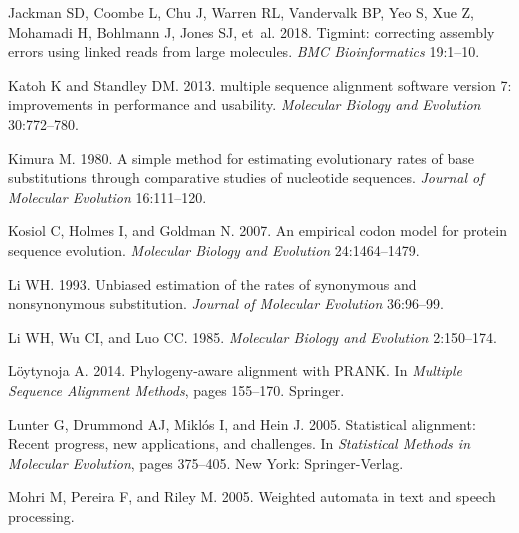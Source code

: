 \documentclass[12pt,letterpaper]{article}
\begin{document}
\begin{thebibliography}{43}
Jackman SD, Coombe L, Chu J, Warren RL, Vandervalk BP, Yeo S, Xue Z, Mohamadi
  H, Bohlmann J, Jones SJ, et~al. 2018.
\newblock Tigmint: correcting assembly errors using linked reads from large
  molecules.
\newblock \emph{BMC Bioinformatics} 19:1--10.

Katoh K and Standley DM. 2013.
 multiple sequence alignment software version 7: improvements
  in performance and usability.
\newblock \emph{Molecular Biology and Evolution} 30:772--780.

Kimura M. 1980.
\newblock A simple method for estimating evolutionary rates of base
  substitutions through comparative studies of nucleotide sequences.
\newblock \emph{Journal of Molecular Evolution} 16:111--120.

Kosiol C, Holmes I, and Goldman N. 2007.
\newblock An empirical codon model for protein sequence evolution.
\newblock \emph{Molecular Biology and Evolution} 24:1464--1479.

Li WH. 1993.
\newblock Unbiased estimation of the rates of synonymous and nonsynonymous
  substitution.
\newblock \emph{Journal of Molecular Evolution} 36:96--99.

Li WH, Wu CI, and Luo CC. 1985.
\newblock \emph{Molecular Biology and Evolution} 2:150--174.

L{\"o}ytynoja A. 2014.
\newblock Phylogeny-aware alignment with {PRANK}.
\newblock In \emph{Multiple Sequence Alignment Methods}, pages 155--170.
  Springer.

Lunter G, Drummond AJ, Mikl{\'o}s I, and Hein J. 2005.
\newblock Statistical alignment: Recent progress, new applications, and
  challenges.
\newblock In \emph{Statistical Methods in Molecular Evolution}, pages 375--405.
  New York: Springer-Verlag.

Mohri M, Pereira F, and Riley M. 2005.
\newblock Weighted automata in text and speech processing.


\end{thebibliography}
\end{document}
